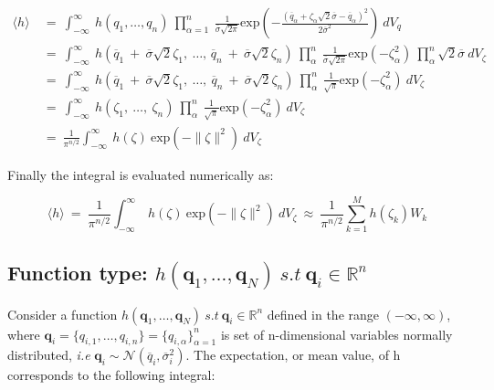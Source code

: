 \documentclass{article}
\begin{document}
\begin{equation}
    \begin{split}
        \langle h \rangle\ &=\ \int^{\infty}_{-\infty}\ h(q_1, \ldots, q_n)\ \prod_{\alpha = 1}^{n}\ \frac{1}{\overline{\sigma}\sqrt{2\pi}} \text{exp}\left(- \frac{(\overline{q}_{\alpha} + \zeta_{\alpha} \sqrt{2}\overline{\sigma} - \overline{q}_{\alpha})^2}{2 \overline{\sigma}^2}\right)\ dV_q \\
        &=\ \int^{\infty}_{-\infty}\ h(\overline{q}_1\ +\ \overline{\sigma}\sqrt{2}\zeta_1,\ \ldots,\, \overline{q}_n\ +\ \overline{\sigma}\sqrt{2}\zeta_n)\ \prod_{\alpha}^{n}\ \frac{1}{\overline{\sigma}\sqrt{2\pi}} \text{exp}\left(- \zeta_{\alpha}^2 \right)\  \prod_{\alpha}^{n} \sqrt{2}\overline{\sigma}\ dV_{\zeta} \\
        &=\ \int^{\infty}_{-\infty}\ h(\overline{q}_1\ +\ \overline{\sigma}\sqrt{2}\zeta_1,\ \ldots,\ \overline{q}_n\ +\ \overline{\sigma}\sqrt{2}\zeta_n)\ \prod_{\alpha}^{n}\ \frac{1}{\sqrt{\pi}} \text{exp}\left(- \zeta_{\alpha}^2\right)\ dV_{\zeta} \\ 
        &=\ \int^{\infty}_{-\infty}\ h(\zeta_1,\ \ldots,\ \zeta_n)\ \prod_{\alpha}^{n}\ \frac{1}{\sqrt{\pi}} \text{exp}\left(- \zeta_{\alpha}^2\right)\ dV_{\zeta} \\
        &=\ \frac{1}{\pi^{n/2}} \int^{\infty}_{-\infty}\ h(\zeta)\ \text{exp}\left(- \| \zeta\|^2\right)\ dV_{\zeta}          
    \end{split}
\end{equation}

Finally the integral is evaluated numerically as:

\begin{equation}
\langle h \rangle\ =\ \frac{1}{\pi^{n/2}} \int^{\infty}_{-\infty}\ h(\zeta)\ \text{exp}\left(- \| \zeta\|^2\right)\ dV_{\zeta}\ \approx\ \frac{1}{\pi^{n/2}} \sum_{k=1}^M h(\zeta_k)W_k
\end{equation}


\subsection{Function type: $h(\mathbf{q}_1 , \ldots , \mathbf{q}_N)\ s.t\ \mathbf{q}_i \in  \mathbb{R}^n$}

Consider a function $h(\mathbf{q}_1 , \ldots , \mathbf{q}_N)\ s.t\ \mathbf{q}_i \in \mathbb{R}^n$ defined in the range $(-\infty , \infty)$, where $\mathbf{q}_i = \{q_{i,1}, \ldots, q_{i,n} \} = \{q_{i,\alpha}\}_{\alpha = 1}^{n}$ is set of n-dimensional variables normally distributed, {\it i.e} $\mathbf{q}_i \sim \mathcal{N}(\overline{q}_i , \overline{\sigma}_i^{2})$. The expectation, or mean value, of h corresponds to the following integral:
\end{document}
